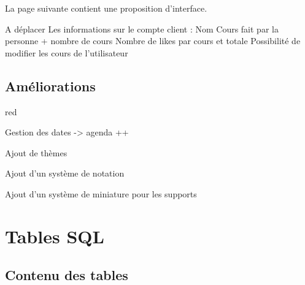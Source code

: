 La page suivante contient une proposition d'interface.

A déplacer
Les informations sur le compte client :
Nom
Cours fait par la personne + nombre de cours
Nombre de likes par cours et totale
Possibilité de modifier les cours de l'utilisateur

\section{Améliorations}


\begin{items}{red}{\Triangle}
\item Gestion des dates ->  agenda ++
\item Ajout de thèmes
\item Ajout d'un système de notation
\item Ajout d'un système de miniature pour les supports
\end{items}







\chapter{Tables SQL}

\section{Contenu des tables}

